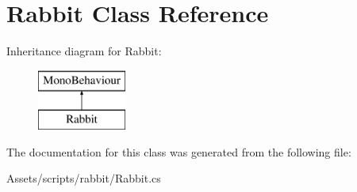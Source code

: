 \hypertarget{class_rabbit}{}\section{Rabbit Class Reference}
\label{class_rabbit}
Inheritance diagram for Rabbit\+:\begin{figure}[H]
\begin{center}
\leavevmode
\includegraphics[height=2.000000cm]{class_rabbit}
\end{center}
\end{figure}


The documentation for this class was generated from the following file\+:\begin{DoxyCompactItemize}
\item 
Assets/scripts/rabbit/Rabbit.\+cs\end{DoxyCompactItemize}
